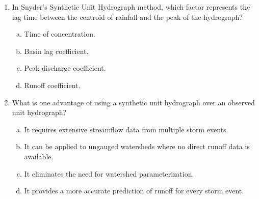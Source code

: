 \documentclass[12pt]{article}
\begin{document}
\begin{enumerate}
\item In Snyder's Synthetic Unit Hydrograph method, which factor represents the lag time between the centroid of rainfall and the peak of the hydrograph?
\begin{enumerate}[a)]
\item Time of concentration.
\item Basin lag coefficient.
\item Peak discharge coefficient.
\item Runoff coefficient.
\end{enumerate}
\item What is one advantage of using a synthetic unit hydrograph over an observed unit hydrograph?
\begin{enumerate}[a)]
\item It requires extensive streamflow data from multiple storm events.
\item It can be applied to ungauged watersheds where no direct runoff data is available.
\item It eliminates the need for watershed parameterization.
\item It provides a more accurate prediction of runoff for every storm event.
\end{enumerate}

\clearpage
\end{enumerate}
\end{document}
